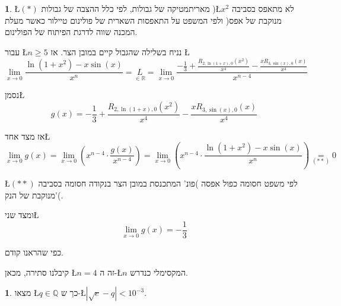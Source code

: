 \documentclass[english,hebrew]{article}
\theoremstyle{plain}
\theoremstyle{definition}
\newtheorem{problem}[thm]{\protect\problemname}
\theoremstyle{definition}
\newtheorem*{sol*}{\protect\solutionname}
\providecommand{\problemname}{בעיה}
\providecommand{\solutionname}{פתרון}
\begin{document}
\begin{sol*}
\L{$(*)$} מאריתמטיקה של גבולות, לפי כלל ההצבה של גבולות )\L{$x^{2}$}
לא מתאפס בסביבה מנוקבת של אפס( ולפי המשפט על התאפסות השארית של פולינום
טיילור כאשר מעלת המכנה שווה לדרגת הפיתוח של הפולינום.

עבור \L{$n\ge5$} נניח בשלילה שהגבול קיים במובן הצר. אז \L{%
\[
\lim_{x\to0}\frac{\ln(1+x^{2})-x\sin(x)}{x^{n}}=\underset{\in\mathbb{R}}{L}=\lim_{x\to0}\frac{-\frac{1}{3}+\frac{R_{2,\ln\left(1+x\right),0}\left(x^{2}\right)}{x^{4}}-\frac{xR_{3,\sin\left(x\right),0}(x)}{x^{4}}}{x^{n-4}}
\]
}%

נסמן\L{%
\[
g(x)=-\frac{1}{3}+\frac{R_{2,\ln\left(1+x\right),0}\left(x^{2}\right)}{x^{4}}-\frac{xR_{3,\sin\left(x\right),0}(x)}{x^{4}}
\]
}%

אז מצד אחד\L{%
\[
\lim_{x\to0}g(x)=\lim_{x\to0}\left(x^{n-4}\cdot\frac{g(x)}{x^{n-4}}\right)=\lim_{x\to0}\left(x^{n-4}\cdot\frac{\ln(1+x^{2})-x\sin(x)}{x^{n}}\right)\underset{\left(**\right)}{=}0
\]
}%

\L{$\left(**\right)$} לפי משפט חסומה כפול אפסה )פונ' המתכנסת במובן
הצר בנקודה חסומה בסביבה מנוקבת של הנק'(.

ומצד שני\L{%
\[
\lim_{x\to0}g(x)=-\frac{1}{3}
\]
}%

כפי שהראנו קודם.

קיבלנו סתירה, מכאן \L{$n=4$} זה ה-\L{$n$} המקסימלי כנדרש.

\newpage{}
\end{sol*}
\begin{problem}
מצאו \L{$q\in\mathbb{Q}$} כך ש-\L{$|\sqrt{e}-q|<10^{-3}$}.
\end{problem}
\end{document}
